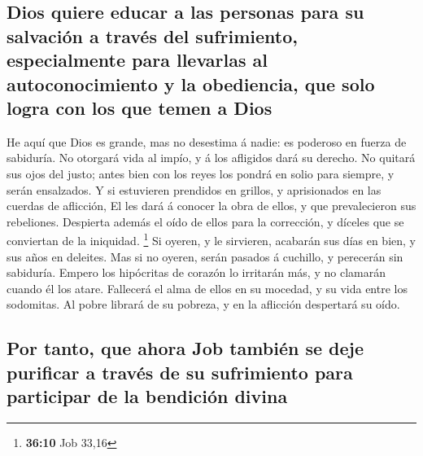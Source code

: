 \hypertarget{dios-quiere-educar-a-las-personas-para-su-salvaciuxf3n-a-travuxe9s-del-sufrimiento-especialmente-para-llevarlas-al-autoconocimiento-y-la-obediencia-que-solo-logra-con-los-que-temen-a-dios}{%
\subsection{Dios quiere educar a las personas para su salvación a través
del sufrimiento, especialmente para llevarlas al autoconocimiento y la
obediencia, que solo logra con los que temen a
Dios}\label{dios-quiere-educar-a-las-personas-para-su-salvaciuxf3n-a-travuxe9s-del-sufrimiento-especialmente-para-llevarlas-al-autoconocimiento-y-la-obediencia-que-solo-logra-con-los-que-temen-a-dios}}

 He aquí que Dios es grande, mas no desestima á nadie: es
poderoso en fuerza de sabiduría.  No otorgará vida al impío,
y á los afligidos dará su derecho.  No quitará sus ojos del
justo; antes bien con los reyes los pondrá en solio para siempre, y
serán ensalzados.  Y si estuvieren prendidos en grillos, y
aprisionados en las cuerdas de aflicción,  El les dará á
conocer la obra de ellos, y que prevalecieron sus rebeliones.
 Despierta además el oído de ellos para la corrección, y
díceles que se conviertan de la iniquidad. \footnote{\textbf{36:10} Job
  33,16}  Si oyeren, y le sirvieren, acabarán sus días en
bien, y sus años en deleites.  Mas si no oyeren, serán
pasados á cuchillo, y perecerán sin sabiduría.  Empero los
hipócritas de corazón lo irritarán más, y no clamarán cuando él los
atare.  Fallecerá el alma de ellos en su mocedad, y su vida
entre los sodomitas.  Al pobre librará de su pobreza, y en
la aflicción despertará su oído.

\hypertarget{por-tanto-que-ahora-job-tambiuxe9n-se-deje-purificar-a-travuxe9s-de-su-sufrimiento-para-participar-de-la-bendiciuxf3n-divina}{%
\subsection{Por tanto, que ahora Job también se deje purificar a través
de su sufrimiento para participar de la bendición
divina}\label{por-tanto-que-ahora-job-tambiuxe9n-se-deje-purificar-a-travuxe9s-de-su-sufrimiento-para-participar-de-la-bendiciuxf3n-divina}}

